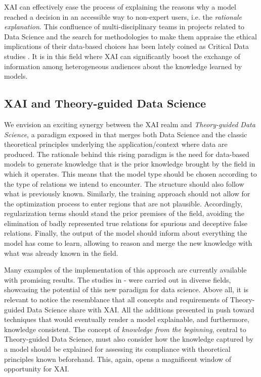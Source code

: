 \documentclass[final]{elsarticle}
\begin{document}
{\color{black}XAI can effectively ease the process of explaining the reasons why a model reached a decision in an accessible way to non-expert users, i.e. the \emph{rationale explanation}.} This confluence of multi-disciplinary teams in projects related to Data Science and the search for methodologies to make them appraise the ethical implications of their data-based choices has been lately coined as Critical Data studies \cite{iliadis2016critical}. It is in this field where XAI can significantly boost the exchange of information among heterogeneous audiences about the knowledge learned by models.

\subsection{XAI and Theory-guided Data Science} \label{ssec:tgds}

We envision an exciting synergy between the XAI realm and \emph{Theory-guided Data Science}, a paradigm exposed in \cite{TGDSkarpatne2017theory} that merges both Data Science and the classic theoretical principles underlying the application/context where data are produced. The rationale behind this rising paradigm is the need for data-based models to generate knowledge that is the prior knowledge brought by the field in which it operates. This means that the model type should be chosen according to the type of relations we intend to encounter. The structure should also follow what is previously known. Similarly, the training approach should not allow for the optimization process to enter regions that are not plausible. Accordingly, regularization terms should stand the prior premises of the field, avoiding the elimination of badly represented true relations for spurious and deceptive false relations. Finally, the output of the model should inform about everything the model has come to learn, allowing to reason and merge the new knowledge with what was already known in the field.

Many examples of the implementation of this approach are currently available with promising results. The studies in \cite{TGDShautier2010finding}-\nocite{TGDSfischer2006predicting,TGDScurtarolo2013high,TGDSwong2009active,TGDSxu2015robust,Lesort:17,TGDSleibo2017view}\cite{TGDSschrodt2015bhpmf} were carried out in diverse fields, showcasing the potential of this new paradigm for data science. Above all, it is relevant to notice the resemblance that all concepts and requirements of Theory-guided Data Science share with XAI. All the additions presented in \cite{TGDSkarpatne2017theory} push toward techniques that would eventually render a model explainable, and furthermore, knowledge consistent. The concept of \emph{knowledge from the beginning}, central to Theory-guided Data Science, must also consider how the knowledge captured by a model should be explained for assessing its compliance with theoretical principles known beforehand. This, again, opens a magnificent window of opportunity for XAI.
\end{document}
